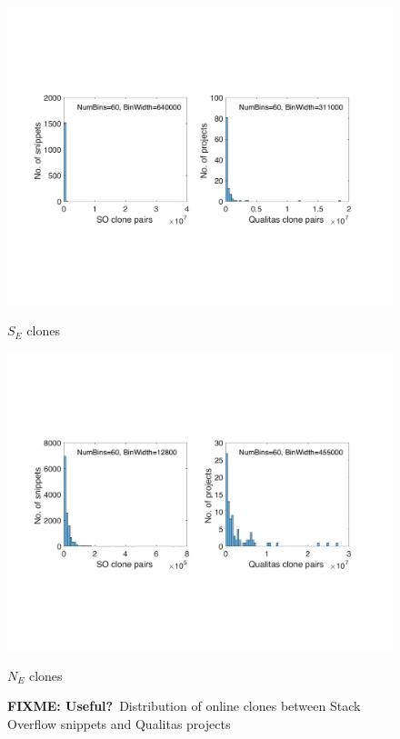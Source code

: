 \documentclass[sigconf,review, anonymous]{acmart}
\newcommand\FIXME[1]{\textbf{FIXME: #1}}
\begin{document}
\begin{figure}
\begin{minipage}{.4\textwidth}
			\includegraphics[width=\linewidth]{hist_se}
			\caption*{$S_E$ clones}
		\end{minipage}%
		\hspace{5ex}
		\begin{minipage}{0.4\textwidth}
			\centering
			\includegraphics[width=\linewidth]{hist_ne}
			\caption*{$N_E$ clones}
		\end{minipage}
	\caption{\FIXME{Useful?}~Distribution of online clones between Stack Overflow snippets and Qualitas projects}
	\label{fig:histogram}
\end{figure}
\end{document}
